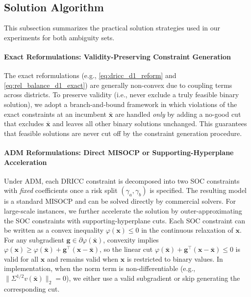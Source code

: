 \documentclass[preprint,12pt,authoryear]{elsarticle}
\begin{document}
\subsection{Solution Algorithm}
\label{sec:solution_algorithm}

This subsection summarizes the practical solution strategies used in our experiments for both ambiguity sets.

\paragraph{Exact Reformulations: Validity-Preserving Constraint Generation}
The exact reformulations (e.g., \eqref{eq:dricc_d1_reform} and \eqref{eq:rel_balance_d1_exact}) are generally non-convex due to coupling terms across districts. To preserve validity (i.e., never exclude a truly feasible binary solution), we adopt a branch-and-bound framework in which violations of the exact constraints at an incumbent $\bar{\mathbf{x}}$ are handled \emph{only} by adding a no-good cut that excludes $\bar{\mathbf{x}}$ and leaves all other binary solutions unchanged. This guarantees that feasible solutions are never cut off by the constraint generation procedure.

\paragraph{ADM Reformulations: Direct MISOCP or Supporting-Hyperplane Acceleration}
Under ADM, each DRICC constraint is decomposed into two SOC constraints with \emph{fixed} coefficients once a risk split $(\gamma_a,\gamma_b)$ is specified. The resulting model is a standard MISOCP and can be solved directly by commercial solvers.
For large-scale instances, we further accelerate the solution by outer-approximating the SOC constraints with supporting-hyperplane cuts. Each SOC constraint can be written as a convex inequality $\varphi(\mathbf{x})\le 0$ in the continuous relaxation of $\mathbf{x}$. For any subgradient $\mathbf{g}\in\partial\varphi(\bar{\mathbf{x}})$, convexity implies
$\varphi(\mathbf{x})\ge \varphi(\bar{\mathbf{x}})+\mathbf{g}^\top(\mathbf{x}-\bar{\mathbf{x}})$,
so the linear cut $\varphi(\bar{\mathbf{x}})+\mathbf{g}^\top(\mathbf{x}-\bar{\mathbf{x}})\le 0$ is valid for all $\mathbf{x}$ and remains valid when $\mathbf{x}$ is restricted to binary values. In implementation, when the norm term is non-differentiable (e.g., $\|\Sigma^{1/2}v(\bar{\mathbf{x}})\|_2=0$), we either use a valid subgradient or skip generating the corresponding cut.
\end{document}

